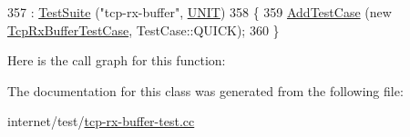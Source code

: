 \begin{DoxyCode}
357     : \hyperlink{classns3_1_1TestSuite_a904b0c40583b744d30908aeb94636d1a}{TestSuite} (\textcolor{stringliteral}{"tcp-rx-buffer"}, \hyperlink{classns3_1_1TestSuite_a1ebfcab34ec8161e085e8e3a1855eae0a3885375a3787abf60431f8454b3cadbd}{UNIT})
358   \{
359     \hyperlink{classns3_1_1TestCase_a3718088e3eefd5d6454569d2e0ddd835}{AddTestCase} (\textcolor{keyword}{new} \hyperlink{classTcpRxBufferTestCase}{TcpRxBufferTestCase}, TestCase::QUICK);
360   \}
\end{DoxyCode}


Here is the call graph for this function\+:




The documentation for this class was generated from the following file\+:\begin{DoxyCompactItemize}
\item 
internet/test/\hyperlink{tcp-rx-buffer-test_8cc}{tcp-\/rx-\/buffer-\/test.\+cc}\end{DoxyCompactItemize}
